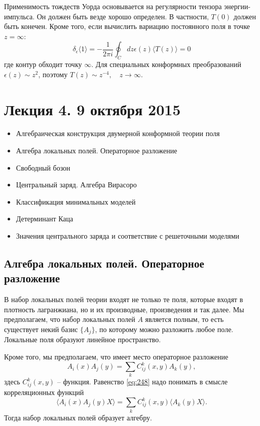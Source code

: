 \documentclass[a4paper,12pt]{article} \usepackage[utf8x]{inputenc} \usepackage[russian]{babel}
\theoremstyle{definition} \newtheorem{corollary}{Corollary}[theorem] \theoremstyle{definition}
\begin{document}
Применимость тождеств Уорда основывается на регулярности тензора энергии-импульса. Он должен быть
везде хорошо определен. В частности, $T(0)$ должен быть конечен. Кроме того, если вычислить вариацию
постоянного поля в точке $z=\infty$:
\begin{equation}
  \label{eq:247} \delta_{\epsilon} \langle 1\rangle =-\frac{1}{2\pi i} \oint_{C}dz \epsilon(z)
\langle T(z)\rangle =0
\end{equation} где контур обходит точку $\infty$. Для специальных конформных преобразований
$\epsilon(z)\sim z^{2}$, поэтому $T(z)\sim z^{-4},\quad z\to \infty$.

\section{Лекция 4. 9 октября 2015}
\label{sec:-6}


  \begin{itemize}
  \item Алгебраическая конструкция двумерной конформной теории поля
  \item Алгебра локальных полей. Операторное разложение
  \item Свободный бозон
  \item Центральный заряд. Алгебра Вирасоро
  \item Классификация минимальных моделей
  \item Детерминант Каца
  \item Значения центрального заряда и соответствие с решеточными моделями
  \end{itemize}


\subsection{Алгебра локальных полей. Операторное разложение}
\label{sec:ope}

В набор локальных полей теории входят не только те поля, которые входят в плотность лагранжиана, но
и их производные, произведения и так далее. Мы предполагаем, что набор локальных полей $A$ является
полным, то есть существует некий базис $\{ A_{j}\}$, по которому можно разложить любое поле.
Локальные поля образуют линейное пространство.

Кроме того, мы предполагаем, что имеет место операторное разложение
\begin{equation}
  \label{eq:248} A_{i}(x)A_{j}(y) =\sum_{k} C^{k}_{ij} (x,y) A_{k}(y),
\end{equation} здесь $C_{ij}^{k}(x,y)$ -- функция. Равенство \eqref{eq:248} надо понимать в смысле
корреляционных функций
\begin{equation}
  \label{eq:249} \langle A_{i}(x) A_{j}(y) X\rangle = \sum_{k} C^{k}_{ij} (x,y) \langle A_{k}(y)
X\rangle.
\end{equation} Тогда набор локальных полей образует алгебру.
\end{document}
